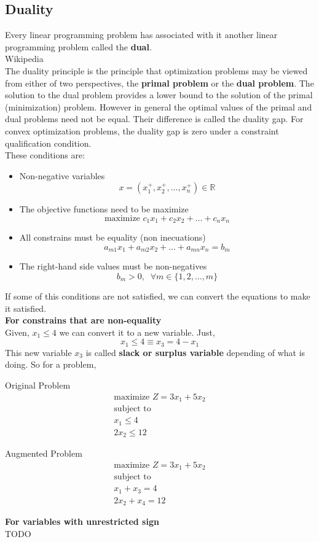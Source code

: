 \subsection{Duality}
Every linear programming problem has associated with it another linear programming
problem called the \textbf{dual}.\\

Wikipedia\\
The duality principle is the principle that optimization problems may be viewed from either of two perspectives, the \textbf{primal problem} or the \textbf{dual problem}. 
The solution to the dual problem provides a lower bound to the solution of the primal (minimization) problem. However in general the optimal values of 
the primal and dual problems need not be equal. Their difference is called the duality gap. For convex optimization problems, the duality gap is zero under 
a constraint qualification condition. \\

These conditions are:
\begin{itemize}
    \item Non-negative variables
    \[x = (x_1^+, x_2^+, \dots , x_n^+) \in \mathbb{R}\]
    \item The objective functions need to be maximize
    \[ \text{maximize } c_1x_1 + c_2x_2 + \dots + c_nx_n\]
    \item All constrains must be equality (non inecuations)
    \[ a_{m1}x_1 + a_{m2}x_2 + \dots + a_{mn}x_n = b_m \]
    \item The right-hand side values must be non-negatives
    \[ b_m > 0,\;\; \forall m \in \{1,2,\dots,m\} \]
\end{itemize}

If some of this conditions are not satisfied, we can convert the equations to make it satisfied.\\
\textbf{For constrains that are non-equality}\\
Given, $x_1 \leq 4$ we can convert it to a new variable. Just,
\[ x_1 \leq 4 \equiv  x_3 = 4 - x_1\]
This new variable $x_3$ is called \textbf{slack or surplus variable} depending of what is doing. So for a problem,
\setlength{\columnseprule}{1pt}
\begin{multicols}{2}
    Original Problem \begin{multline*} 
        \text{maximize } Z = 3x_1 + 5x_2 \\
        \text{subject to }\\
        x_1 \leq 4\\
        2x_2 \leq 12
    \end{multline*}

    Augmented Problem \begin{multline*}
        \text{maximize } Z = 3x_1 + 5x_2 \\
        \text{subject to }\\
        x_1 + x_3 = 4\\
        2x_2 + x_4 = 12
    \end{multline*}
\end{multicols}
\textbf{For variables with unrestricted sign}\\
TODO

